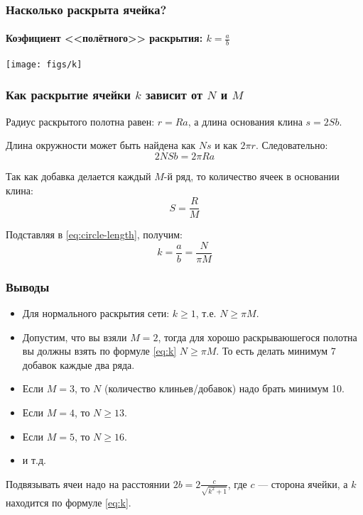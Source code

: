 \begin{frame}
    \frametitle{Насколько раскрыта ячейка?}
    \framesubtitle{Коэфициент <<полётного>> раскрытия: $k=\frac{a}{b}$}

    \begin{center}
        \texttt{[image: figs/k]}
    \end{center}
\end{frame}

\begin{frame}
    \frametitle{Как раскрытие ячейки $k$ зависит от $N$ и $M$}

	Радиус раскрытого полотна равен: $r=Ra$, а длина основания клина $s=2Sb$.
	
	Длина окружности может быть найдена как $Ns$ и как $2\pi r$. Следовательно:
	\begin{equation}
		\label{eq:circle-length}
		2NSb=2\pi Ra
	\end{equation}
	
	Так как добавка делается каждый $M$-й ряд, то количество ячеек в основании клина:
	\[
		S=\frac{R}{M}
	\]
	
	Подставляя в \eqref{eq:circle-length}, получим:
	\begin{equation}
		\label{eq:k}
		k=\frac{a}{b}=\frac{N}{\pi M}
	\end{equation}
\end{frame}

\begin{frame}
    \frametitle{Выводы}

	\begin{itemize}
		\item Для нормального раскрытия сети: $k\geq 1$, т.е. $N\geq \pi M$.
		\item Допустим, что вы взяли $M=2$, тогда для хорошо раскрываюшегося полотна вы должны взять по формуле \eqref{eq:k} $N\geq \pi M$. То есть делать минимум 7 добавок каждые два ряда.
		\item Если $M=3$, то $N$ (количество клиньев/добавок) надо брать минимум 10.
		\item Если $M=4$, то $N\geq 13$.
		\item Если $M=5$, то $N\geq 16$.
		\item и т.д.
	\end{itemize}
	
	Подвязывать ячеи надо на расстоянии $2b=2\frac{c}{\sqrt{k^2+1}}$, где $c$ --- сторона ячейки, а $k$ находится по формуле \eqref{eq:k}.
\end{frame}

